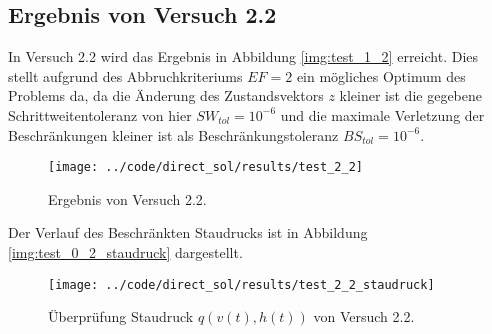 \subsection{Ergebnis von Versuch 2.2}\label{kap:Versuch22}
In Versuch 2.2 wird das Ergebnis in Abbildung \ref{img:test_1_2} erreicht. Dies stellt aufgrund des Abbruchkriteriums $EF = 2$ ein mögliches Optimum des Problems da, da die Änderung des Zustandsvektors $z$ kleiner ist die gegebene Schrittweitentoleranz von hier $SW_{tol} = 10^{-6}$ und die maximale Verletzung der Beschränkungen kleiner ist als Beschränkungstoleranz $BS_{tol} = 10^{-6}$.
\begin{figure}[H]
\begin{center}
\texttt{[image: ../code/direct\_sol/results/test\_2\_2]}
\caption{Ergebnis von Versuch 2.2.}\label{img:test_2_2}
\end{center}
\end{figure}
Der Verlauf des Beschränkten Staudrucks ist in Abbildung \ref{img:test_0_2_staudruck} dargestellt.
\begin{figure}[H]
\begin{center}
\texttt{[image: ../code/direct\_sol/results/test\_2\_2\_staudruck]}
\caption{Überprüfung Staudruck $q(v(t),h(t))$ von Versuch 2.2.}\label{img:test_2_2_staudruck}
\end{center}
\end{figure}














\newpage
